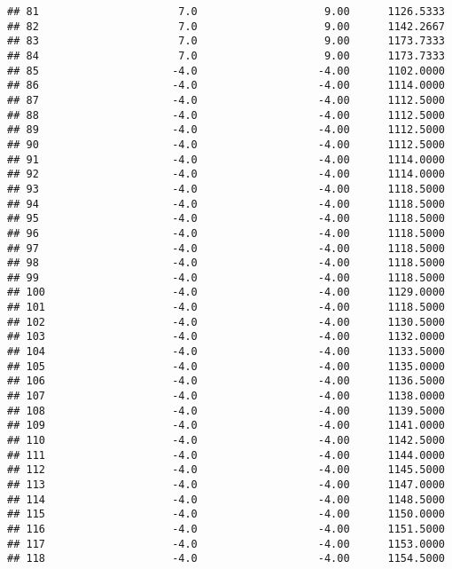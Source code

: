 \documentclass[]{article}
\begin{document}
\begin{verbatim}
## 81                      7.0                    9.00      1126.5333
## 82                      7.0                    9.00      1142.2667
## 83                      7.0                    9.00      1173.7333
## 84                      7.0                    9.00      1173.7333
## 85                     -4.0                   -4.00      1102.0000
## 86                     -4.0                   -4.00      1114.0000
## 87                     -4.0                   -4.00      1112.5000
## 88                     -4.0                   -4.00      1112.5000
## 89                     -4.0                   -4.00      1112.5000
## 90                     -4.0                   -4.00      1112.5000
## 91                     -4.0                   -4.00      1114.0000
## 92                     -4.0                   -4.00      1114.0000
## 93                     -4.0                   -4.00      1118.5000
## 94                     -4.0                   -4.00      1118.5000
## 95                     -4.0                   -4.00      1118.5000
## 96                     -4.0                   -4.00      1118.5000
## 97                     -4.0                   -4.00      1118.5000
## 98                     -4.0                   -4.00      1118.5000
## 99                     -4.0                   -4.00      1118.5000
## 100                    -4.0                   -4.00      1129.0000
## 101                    -4.0                   -4.00      1118.5000
## 102                    -4.0                   -4.00      1130.5000
## 103                    -4.0                   -4.00      1132.0000
## 104                    -4.0                   -4.00      1133.5000
## 105                    -4.0                   -4.00      1135.0000
## 106                    -4.0                   -4.00      1136.5000
## 107                    -4.0                   -4.00      1138.0000
## 108                    -4.0                   -4.00      1139.5000
## 109                    -4.0                   -4.00      1141.0000
## 110                    -4.0                   -4.00      1142.5000
## 111                    -4.0                   -4.00      1144.0000
## 112                    -4.0                   -4.00      1145.5000
## 113                    -4.0                   -4.00      1147.0000
## 114                    -4.0                   -4.00      1148.5000
## 115                    -4.0                   -4.00      1150.0000
## 116                    -4.0                   -4.00      1151.5000
## 117                    -4.0                   -4.00      1153.0000
## 118                    -4.0                   -4.00      1154.5000

\end{verbatim}
\end{document}
